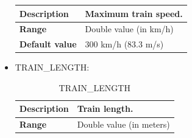 \documentclass{template/openetcs}
\begin{document}
\begin{itemize}
\begin{longtable}{|l|l|}
					\begin{minipage}[t]{0.22\linewidth} \textbf{Description}	\end{minipage} 
				&	\begin{minipage}[t]{0.78\linewidth} Maximum train speed. \end{minipage} \\
				
				\hline
																																									
					\begin{minipage}[t]{0.22\linewidth} \textbf{Range}	\end{minipage} 
				&	\begin{minipage}[t]{0.78\linewidth} Double value (in km/h) \end{minipage} \\
				
				\hline
				
					\begin{minipage}[t]{0.22\linewidth} \textbf{Default value}	\end{minipage} 
				&	\begin{minipage}[t]{0.78\linewidth} 300 km/h (83.3 m/s) \end{minipage} \\
				
				\hline
				
			\end{longtable}
			
		\item TRAIN\_LENGTH:
																									
			\begin{longtable}{|l|l|}
				\caption{TRAIN\_LENGTH}\\ 
				\hline
				
					\begin{minipage}[t]{0.22\linewidth} \textbf{Description}	\end{minipage} 
				&	\begin{minipage}[t]{0.78\linewidth} Train length. \end{minipage} \\
				
				\hline
																																									
					\begin{minipage}[t]{0.22\linewidth} \textbf{Range}	\end{minipage} 
				&	\begin{minipage}[t]{0.78\linewidth} Double value (in meters) \end{minipage} \\
				

\end{longtable}
\end{itemize}
\end{document}
